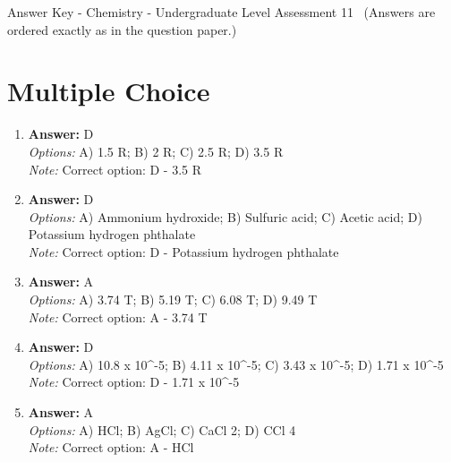 \documentclass[12pt]{article}
\begin{document}
\begin{center}
Answer Key - Chemistry - Undergraduate Level Assessment 11 \
\small (Answers are ordered exactly as in the question paper.)
\end{center}

\section*{Multiple Choice}
\begin{enumerate}[label=\arabic*.]
\item \textbf{Answer:} D
\\ \textit{Options:} A) 1.5 R; B) 2 R; C) 2.5 R; D) 3.5 R
\\ \textit{Note:} Correct option: D - 3.5 R
\item \textbf{Answer:} D
\\ \textit{Options:} A) Ammonium hydroxide; B) Sulfuric acid; C) Acetic acid; D) Potassium hydrogen phthalate
\\ \textit{Note:} Correct option: D - Potassium hydrogen phthalate
\item \textbf{Answer:} A
\\ \textit{Options:} A) 3.74 T; B) 5.19 T; C) 6.08 T; D) 9.49 T
\\ \textit{Note:} Correct option: A - 3.74 T
\item \textbf{Answer:} D
\\ \textit{Options:} A) 10.8 x 10^-5; B) 4.11 x 10^-5; C) 3.43 x 10^-5; D) 1.71 x 10^-5
\\ \textit{Note:} Correct option: D - 1.71 x 10^-5
\item \textbf{Answer:} A
\\ \textit{Options:} A) HCl; B) AgCl; C) CaCl 2; D) CCl 4
\\ \textit{Note:} Correct option: A - HCl
\end{enumerate}
\end{document}
